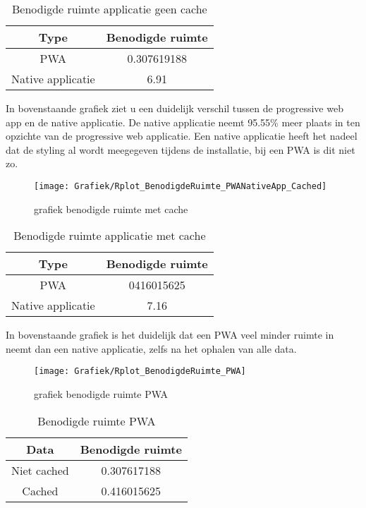 \begin{table}[h!]
	\centering
	\begin{tabular}{|c|c|}
		\hline
		Type              & Benodigde ruimte \\
		\hline
		PWA               & 0.307619188      \\
		\hline
		Native applicatie & 6.91             \\
		\hline
	\end{tabular}
	\label{table:3}
	\caption{Benodigde ruimte applicatie geen cache}
\end{table}
In bovenstaande grafiek ziet u een duidelijk verschil tussen de progressive web app en de native applicatie. De native applicatie neemt 95.55\% meer plaats in ten opzichte van de progressive web applicatie. Een native applicatie heeft het nadeel dat de styling al wordt meegegeven tijdens de installatie, bij een PWA is dit niet zo.

\begin{figure}[H]
	\texttt{[image: Grafiek/Rplot\_BenodigdeRuimte\_PWANativeApp\_Cached]}\centering
	\caption{grafiek benodigde ruimte met cache}
\end{figure}

\begin{table}[h!]
	\centering
	\begin{tabular}{|c|c|}
		\hline
		Type              & Benodigde ruimte \\
		\hline
		PWA               & 0416015625       \\
		\hline
		Native applicatie & 7.16             \\
		\hline
	\end{tabular}
	\label{table:4}
	\caption{Benodigde ruimte applicatie met cache}
\end{table}
In bovenstaande grafiek is het duidelijk dat een PWA veel minder ruimte in neemt dan een native applicatie, zelfs na het ophalen van alle data.

\begin{figure}[H]
	\texttt{[image: Grafiek/Rplot\_BenodigdeRuimte\_PWA]}\centering
	\caption{grafiek benodigde ruimte PWA}
\end{figure}

\begin{table}[h!]
	\centering
	\begin{tabular}{|c|c|}
		\hline
		Data              & Benodigde ruimte \\
		\hline
		Niet cached       & 0.307617188       \\
		\hline
		Cached            & 0.416015625       \\
		\hline
	\end{tabular}
	\label{table:5}
	\caption{Benodigde ruimte PWA}
\end{table}

